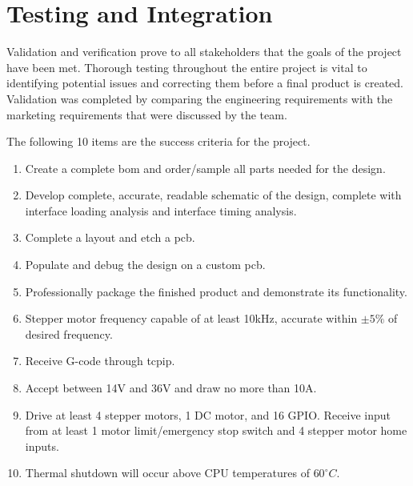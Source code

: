 \newcommand{\testheader}{\textrotate{\textbf{Step}} & \textbf{Action} & \textbf{Expected Result} & \textrotate{\textbf{Pass}} & \textrotate{\textbf{Fail}} & \textrotate{\textbf{N/A}} & \textbf{Comments} \\ \hline}
\newcommand{\testinfo}[2]{\multicolumn{2}{|r|}{\textbf{Test Case Name:}} & \multicolumn{5}{m{11cm}|}{#1} \\ \hline \multicolumn{2}{|r|}{\textbf{Description:}} & \multicolumn{5}{m{11cm}|}{#2} \\ \hline}
\newcommand{\testerinfo}{\multicolumn{2}{|r|}{\textbf{Name of Tester:}} & & \multicolumn{3}{l|}{\textbf{Date:}} & \\ \hline \multicolumn{2}{|r|}{\textbf{HW/SW Version:}} & & \multicolumn{3}{l|}{\textbf{Time:}} & \\ \hline}
\newcommand{\testsetup}[1]{\multicolumn{2}{|r|}{\textbf{Setup:}} & \multicolumn{5}{m{11cm}|}{#1} \\ \hline}
\newcommand{\testtabular}[3]{\begin{tabular}{|m{.25cm}|m{4cm}|m{5cm}|m{.25cm}|m{.25cm}|m{.25cm}|m{3cm}|}\hline\testinfo{#1}{#2}\testerinfo\testsetup{#3}\testheader}

\chapter{Testing and Integration}
Validation and verification prove to all stakeholders that the goals of the project have been met.
Thorough testing throughout the entire project is vital to identifying potential issues and correcting them before a final product is created. 
Validation was completed by comparing the engineering requirements with the marketing requirements that were discussed by the team. 

The following 10 items are the success criteria for the project. 
\begin{enumerate}
	\item Create a complete \gls{bom} and order/sample all parts needed for the design.
	\item Develop complete, accurate, readable schematic of the design, complete with interface loading analysis and interface timing analysis. 
	\item Complete a layout and etch a \gls{pcb}.
	\item Populate and debug the design on a custom \gls{pcb}.
	\item Professionally package the finished product and demonstrate its functionality.
	\item Stepper motor frequency capable of at least 10kHz, accurate within $\pm5\%$ of desired frequency.
	\item Receive G-code through \gls{tcpip}.
	\item Accept between 14V and 36V and draw no more than 10A.
	\item Drive at least 4 stepper motors, 1 DC motor, and 16 GPIO. Receive input from at least 1 motor limit/emergency stop switch and 4 stepper motor home inputs.
	\item Thermal shutdown will occur above CPU temperatures of $60^{\circ}C$.
\end{enumerate}
